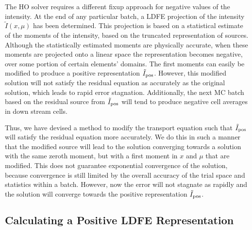The HO solver requires a different fixup approach for negative values of the intensity.
At the end of any particular batch, a LDFE projection of the intensity $\tilde I(x,\mu)$
has been determined.  This projection is based on a statistical estimate of the moments of the
intensity, based on the truncated representation of sources.  Although the statistically estimated moments are 
physically accurate, when these moments are
projected onto a linear space the representation becomes negative, over some portion of certain elements' domains.  The first
moments can easily be modified to produce a positive representation $\tilde I_{{\text{pos}}}$.
However, this modified solution will
not satisfy the residual equation as accurately as the original solution, which leads to
rapid error stagnation.  Additionally, the next MC batch based on the residual source from
$\tilde I_{{\text{pos}}}$ will tend to produce negative cell averages in down stream cells.

Thus, we have devised
a method to modify the transport equation such that $\tilde I_{{\text{pos}}}$ will satisfy the
residual equation more accurately.  We do this in such a manner that the
modified source will lead to the solution converging towards a solution with the same
zeroth moment, but with a first moment in $x$ and $\mu$ that are modified.  This does not
guarantee exponential convergence of the solution, because convergence is still limited by
the overall accuracy of the trial space and statistics within a batch.  However, now the error will not stagnate as rapidly
and the solution will converge towards the positive representation $\tilde I_{{\text{pos}}}$.

\subsection{Calculating a Positive LDFE Representation}
\label{sec:pos_ldfe}

